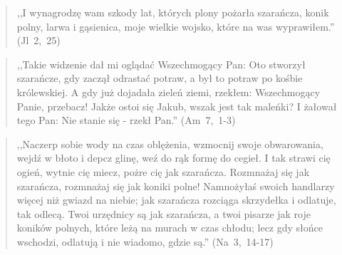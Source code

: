 \documentclass[10pt,a4paper,oneside]{article}
\begin{document}
\begin{quote}
,,I wynagrodzę wam szkody lat, których plony pożarła szarańcza, konik polny, larwa i gąsienica, moje wielkie wojsko, które na was wyprawiłem.'' \mbox{(Jl 2, 25)}
\end{quote}
\begin{quote}
,,Takie widzenie dał mi oglądać Wszechmogący Pan: Oto stworzył szarańcze, gdy zaczął odrastać potraw, a był to potraw po kośbie królewskiej. A gdy już dojadała zieleń ziemi, rzekłem: Wszechmogący Panie, przebacz! Jakże ostoi się Jakub, wszak jest tak maleńki? I żałował tego Pan: Nie stanie się - rzekł Pan.'' \mbox{(Am 7, 1-3)}
\end{quote}
\begin{quote}
,,Naczerp sobie wody na czas oblężenia, wzmocnij swoje obwarowania, wejdź w błoto i depcz glinę, weź do rąk formę do cegieł. I tak strawi cię ogień, wytnie cię miecz, pożre cię jak szarańcza. Rozmnażaj się jak szarańcza, rozmnażaj się jak koniki polne! Namnożyłaś swoich handlarzy więcej niż gwiazd na niebie; jak szarańcza rozciąga skrzydełka i odlatuje, tak odlecą. Twoi urzędnicy są jak szarańcza, a twoi pisarze jak roje koników polnych, które leżą na murach w czas chłodu; lecz gdy słońce wschodzi, odlatują i nie wiadomo, gdzie są.'' \mbox{(Na 3, 14-17)}
\end{quote}
\end{document}

